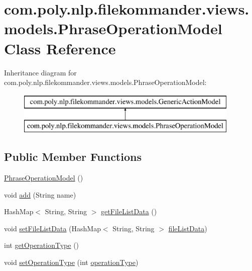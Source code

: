 \hypertarget{classcom_1_1poly_1_1nlp_1_1filekommander_1_1views_1_1models_1_1_phrase_operation_model}{\section{com.\-poly.\-nlp.\-filekommander.\-views.\-models.\-Phrase\-Operation\-Model Class Reference}
\label{classcom_1_1poly_1_1nlp_1_1filekommander_1_1views_1_1models_1_1_phrase_operation_model}
}
Inheritance diagram for com.\-poly.\-nlp.\-filekommander.\-views.\-models.\-Phrase\-Operation\-Model\-:\begin{figure}[H]
\begin{center}
\leavevmode
\includegraphics[height=2.000000cm]{classcom_1_1poly_1_1nlp_1_1filekommander_1_1views_1_1models_1_1_phrase_operation_model}
\end{center}
\end{figure}
\subsection*{Public Member Functions}
\begin{DoxyCompactItemize}
\item 
\hyperlink{classcom_1_1poly_1_1nlp_1_1filekommander_1_1views_1_1models_1_1_phrase_operation_model_a0a3dec91dda5527a9e6b91d8fa0eba83}{Phrase\-Operation\-Model} ()
\item 
void \hyperlink{classcom_1_1poly_1_1nlp_1_1filekommander_1_1views_1_1models_1_1_phrase_operation_model_ab5595eb942a1c0567dbc412af601ef7c}{add} (String name)
\item 
Hash\-Map$<$ String, String $>$ \hyperlink{classcom_1_1poly_1_1nlp_1_1filekommander_1_1views_1_1models_1_1_phrase_operation_model_a80fd6066949ef4eabf1a4c0749afc364}{get\-File\-List\-Data} ()
\item 
void \hyperlink{classcom_1_1poly_1_1nlp_1_1filekommander_1_1views_1_1models_1_1_phrase_operation_model_ace58d8b740d482171bccd637875661f7}{set\-File\-List\-Data} (Hash\-Map$<$ String, String $>$ \hyperlink{classcom_1_1poly_1_1nlp_1_1filekommander_1_1views_1_1models_1_1_phrase_operation_model_afdc0b835818c55deb8ff7f22ec6b3d62}{file\-List\-Data})
\item 
int \hyperlink{classcom_1_1poly_1_1nlp_1_1filekommander_1_1views_1_1models_1_1_phrase_operation_model_ad8d071e0e95d8a5f8afe757e457ced11}{get\-Operation\-Type} ()
\item 
void \hyperlink{classcom_1_1poly_1_1nlp_1_1filekommander_1_1views_1_1models_1_1_phrase_operation_model_aeda52758118855e19786c7bb399fd097}{set\-Operation\-Type} (int \hyperlink{classcom_1_1poly_1_1nlp_1_1filekommander_1_1views_1_1models_1_1_phrase_operation_model_a3cc9f099059b9e5e2f53e450e78650f1}{operation\-Type})
\end{DoxyCompactItemize}
